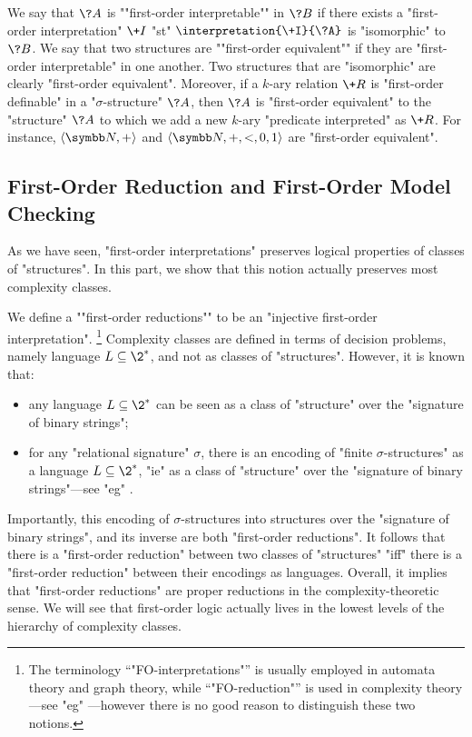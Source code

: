 We say that $\?A$ is \AP""first-order interpretable"" in $\?B$ if there exists
a "first-order interpretation" $\+I$ "st" $\interpretation{\+I}{\?A}$ is "isomorphic" to $\?B$.
We say that two structures are \AP""first-order equivalent"" if they are "first-order interpretable" in one another. Two structures that are "isomorphic" are clearly
"first-order equivalent". Moreover, if a $k$-ary relation $\+R$ is "first-order definable"
in a "$\sigma$-structure" $\?A$, then $\?A$ is "first-order equivalent" to the "structure"
$\?A$ to which we add a new $k$-ary "predicate interpreted" as $\+R$.
For instance, $\tup{\N, +}$ and $\tup{\N, +, <, 0, 1}$ are "first-order equivalent".

\subsection{First-Order Reduction and First-Order Model Checking}

As we have seen, "first-order interpretations" preserves logical properties of classes
of "structures". In this part, we show that this notion actually preserves most complexity classes.

We define a \AP""first-order reductions"" to be an "injective first-order interpretation".%
\footnote{The terminology ``"FO-interpretations"'' is usually employed in automata theory and graph theory, while ``"FO-reduction"'' is used in complexity theory---see "eg" \cite[Definition 2.11 \& Definition 1.26]{Immerman1998DescriptiveComplexity}---however there is no good reason to
distinguish these two notions.}
Complexity classes are defined in terms of decision problems, namely 
language $L \subseteq \2^*$, and not as classes of "structures". 
However, it is known that:
\begin{itemize}
	\item any language $L \subseteq \2^*$
		can be seen as a class of "structure" over the "signature of binary strings";
	\item for any "relational signature" $\sigma$,
		there is an encoding of "finite $\sigma$-structures" as a language
		$L \subseteq \2^*$, "ie" as a class of "structure" over the "signature of binary strings"---see "eg" \cite[\S~2.2]{Immerman1998DescriptiveComplexity}.
\end{itemize}
Importantly, this encoding of $\sigma$-structures into structures over
the "signature of binary strings", and its inverse are both "first-order reductions".
It follows that there is a "first-order reduction" between two classes of "structures"
"iff" there is a "first-order reduction" between their encodings as languages.
Overall, it implies that "first-order reductions" are proper reductions in the complexity-theoretic 
sense. We will see that first-order logic actually lives in the lowest levels of the hierarchy of 
complexity classes.

